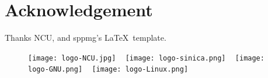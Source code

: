 \documentclass[class=NTHU_thesis, crop=false]{standalone}
\begin{document}
\chapter{Acknowledgement}

Thanks NCU, and sppmg\textquoteright{}s \LaTeX\ template.

\begin{figure}[!hbt]
    \captionsetup[subfigure]{labelformat=empty}
    \centering
    \subcaptionbox
        {}
        {\texttt{[image: logo-NCU.jpg]}}
    ~
    \subcaptionbox
        {}
        {\texttt{[image: logo-sinica.png]}}
    ~
    \subcaptionbox
        {}
        {\texttt{[image: logo-GNU.png]}}
    ~
    \subcaptionbox
        {}
        {\texttt{[image: logo-Linux.png]}}
\end{figure}
\end{document}

